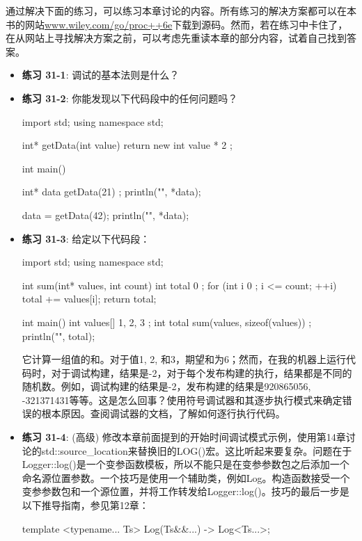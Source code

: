 通过解决下面的练习，可以练习本章讨论的内容。所有练习的解决方案都可以在本书的网站\url{www.wiley.com/go/proc++6e}下载到源码。然而，若在练习中卡住了，在从网站上寻找解决方案之前，可以考虑先重读本章的部分内容，试着自己找到答案。

\begin{itemize}
\item
\textbf{练习 31-1}: 调试的基本法则是什么？

\item
\textbf{练习 31-2}: 你能发现以下代码段中的任何问题吗？

\begin{cpp}
import std;
using namespace std;

int* getData(int value) { return new int { value * 2 }; }

int main()
{
    int* data { getData(21) };
    println("{}", *data);

    data = getData(42);
    println("{}", *data);
}
\end{cpp}

\item
\textbf{练习 31-3}: 给定以下代码段：

\begin{cpp}
import std;
using namespace std;

int sum(int* values, int count)
{
    int total { 0 };
    for (int i { 0 }; i <= count; ++i) { total += values[i]; }
    return total;
}

int main()
{
    int values[] { 1, 2, 3 };
    int total { sum(values, sizeof(values)) };
    println("{}", total);
}
\end{cpp}

它计算一组值的和。对于值1, 2, 和3，期望和为6；然而，在我的机器上运行代码时，对于调试构建，结果是-2，对于每个发布构建的执行，结果都是不同的随机数。例如，调试构建的结果是-2，发布构建的结果是920865056, -321371431等等。这是怎么回事？使用符号调试器和其逐步执行模式来确定错误的根本原因。查阅调试器的文档，了解如何逐行执行代码。

\item
\textbf{练习 31-4}: (高级) 修改本章前面提到的开始时间调试模式示例，使用第14章讨论的std::source\_location来替换旧的LOG()宏。这比听起来要复杂。问题在于Logger::log()是一个变参函数模板，所以不能只是在变参参数包之后添加一个命名源位置参数。一个技巧是使用一个辅助类，例如Log。构造函数接受一个变参参数包和一个源位置，并将工作转发给Logger::log()。技巧的最后一步是以下推导指南，参见第12章：

\begin{cpp}
template <typename... Ts>
Log(Ts&&...) -> Log<Ts...>;
\end{cpp}
\end{itemize}












